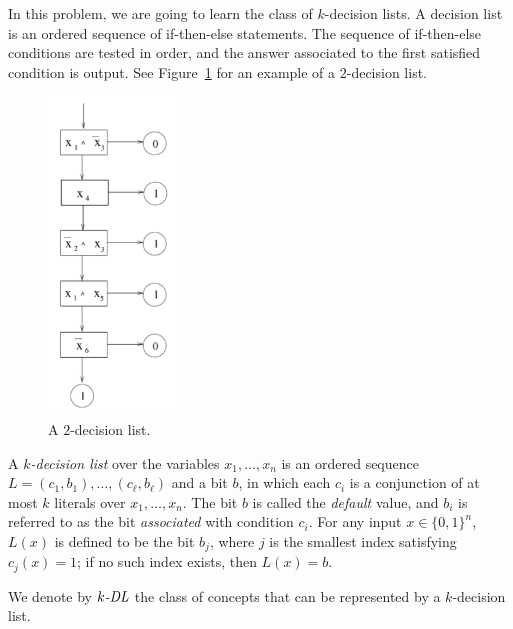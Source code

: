 In this problem, we are going to learn the class of $k$-decision
lists. A decision list is an ordered sequence of if-then-else
statements. The sequence of if-then-else conditions are tested in
order, and the answer associated to the first satisfied condition is
output. See Figure~\ref{fig:decision_list} for an example of a
$2$-decision list.

\begin{figure}[!h]
\begin{center}
\includegraphics[width=1.35in]{fig-1.pdf}
\caption{A $2$-decision list.}
\label{fig:decision_list}
\end{center}
\end{figure}

A {\em $k$-decision list} over the variables $x_{1}, \ldots, x_{n}$ is
an ordered sequence $L=(c_{1}, b_{1}), \ldots, (c_{\ell},b_{\ell})$ and a
bit $b$, in which each $c_{i}$ is a conjunction of at most $k$
literals over $x_{1},\ldots, x_{n}$. The bit $b$ is called the {\em
  default} value, and $b_{i}$ is referred to as the bit {\em
  associated} with condition $c_{i}$. For any input $x \in \{0,
1\}^{n}$, $L(x)$ is defined to be the bit $b_{j}$, where $j$ is the
smallest index satisfying $c_{j}(x)=1$; if no such index exists, then
$L(x)=b$.

We denote by $k\mbox{\em -DL}$ the class of concepts that can be
represented by a $k$-decision list.


